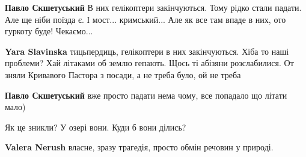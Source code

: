 \begin{itemize}
\begin{itemize}
\textbf{Павло Скшетуський} В них гелікоптери закінчуються. Тому рідко стали
падати. Але ще ніби поїзда є. І мост... кримський... Але як все там впаде в
них, ото гуркоту буде! Чекаємо...

\begin{itemize}
 
\textbf{Yara Slavinska} тицьпердиць, гелікоптери в них закінчуються. Хіба то
наші проблеми? Хай літаками об землю гепають. Щось ті абізяни розслабилися. От
зняли Кривавого Пастора з посади, а не треба було, ой не треба
\end{itemize}

 
\textbf{Павло Скшетуський} вже просто падати нема чому, все попадало що літати мало)

\end{itemize}

 
Як це зникли? У озері вони. Куди б вони ділись?

\begin{itemize}
 
\textbf{Valera Nerush} власне, зразу трагедія, просто обмін речовин у природі.
\end{itemize}

 

\end{itemize}
